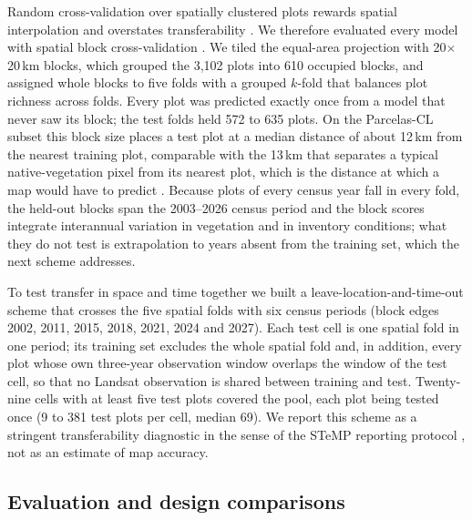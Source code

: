 \documentclass[preprint,12pt]{elsarticle}
\begin{document}
Random cross-validation over spatially clustered plots rewards spatial interpolation and
overstates transferability \citep{roberts2017crossvalidation,ploton2020spatial}. We
therefore evaluated every model with spatial block cross-validation
\citep{valavi2019blockcv}. We tiled the equal-area projection with 20$\times$20\,km blocks,
which grouped the 3,102 plots into 610 occupied blocks, and assigned whole blocks to five
folds with a grouped $k$-fold that balances plot richness across folds. Every plot was
predicted exactly once from a model that never saw its block; the test folds held 572 to
635 plots. On the Parcelas-CL subset this block size places a test plot at a median
distance of about 12\,km from the nearest training plot, comparable with the 13\,km that
separates a typical native-vegetation pixel from its nearest plot, which is the distance
at which a map would have to predict \citep{linnenbrink2026stemp,meyer2021predicting}.
Because plots of every census year fall in every fold, the held-out blocks span the
2003--2026 census period and the block scores integrate interannual variation in
vegetation and in inventory conditions; what they do not test is extrapolation to years
absent from the training set, which the next scheme addresses.

To test transfer in space and time together we built a leave-location-and-time-out scheme
that crosses the five spatial folds with six census periods (block edges 2002, 2011, 2015,
2018, 2021, 2024 and 2027). Each test cell is one spatial fold in one period; its training
set excludes the whole spatial fold and, in addition, every plot whose own three-year
observation window overlaps the window of the test cell, so that no Landsat observation
is shared between training and test. Twenty-nine cells with at least five test plots covered
the pool, each plot being tested once (9 to 381 test plots per cell, median 69). We report
this scheme as a stringent transferability diagnostic in the sense of the STeMP reporting
protocol \citep{linnenbrink2026stemp}, not as an estimate of map accuracy.

\subsection{Evaluation and design comparisons}
\label{sec:ablations}
\end{document}
